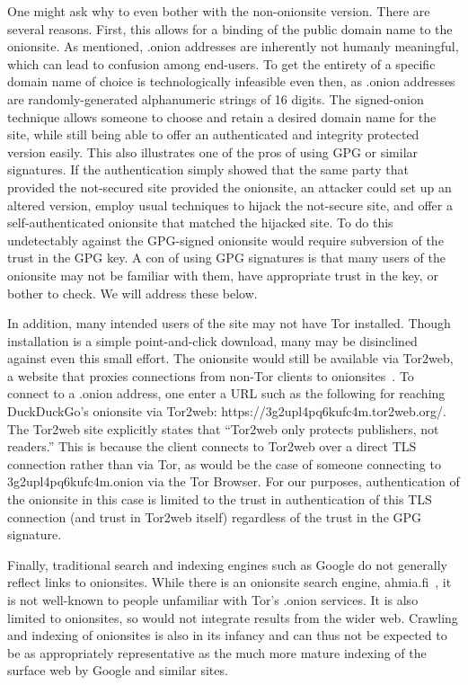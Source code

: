 \documentclass[10pt, conference, compsocconf]{styles/IEEEtran}
\begin{document}
One might ask why to even bother with the non-onionsite version. There
are several reasons. First, this allows for a binding of the public
domain name to the onionsite. As mentioned, .onion addresses are
inherently not humanly meaningful, which can lead to confusion among 
end-users.  To get the entirety of a specific domain name of choice is
technologically infeasible even then, as .onion addresses are
randomly-generated alphanumeric strings of 16 digits. The signed-onion
technique allows someone to choose and retain a desired domain name for the
site, while still being able to offer an authenticated and integrity
protected version easily. This also illustrates one of the pros
of using GPG or similar signatures. If the authentication simply
showed that the same party that provided the not-secured site
provided the onionsite, an attacker could set up an altered version,
employ usual techniques to hijack the not-secure site, and offer
a self-authenticated onionsite that matched the hijacked site.
To do this undetectably against the GPG-signed onionsite would require
subversion of the trust in the GPG key. A con of using GPG signatures
is that many users of the onionsite may not be familiar with them,
have appropriate trust in the key, or bother to check. We will address
these below.

In addition, many intended users of the site may not have Tor installed.
Though installation is a simple point-and-click download, many may be
disinclined against even this small effort. The onionsite would still
be available via Tor2web, a website that proxies connections from
non-Tor clients to onionsites~\cite{tor2web}.  To connect to a .onion
address, one enter a URL such as the following for reaching
DuckDuckGo's onionsite via Tor2web:
https://3g2upl4pq6kufc4m.tor2web.org/. The Tor2web site explicitly
states that ``Tor2web only protects publishers, not readers.'' This is
because the client connects to Tor2web over a direct TLS connection
rather than via Tor, as would be the case of someone connecting to
3g2upl4pq6kufc4m.onion via the Tor Browser.  For our purposes,
authentication of the onionsite in this case is limited to the trust
in authentication of this TLS connection (and trust in Tor2web itself)
regardless of the trust in the GPG signature.

Finally, traditional search and indexing engines such as Google do not
generally reflect links to onionsites. While there is an onionsite
search engine, ahmia.fi~\cite{ahmia}, it is not well-known to people
unfamiliar with Tor's .onion services. It is also limited to
onionsites, so would not integrate results from the wider web.  
Crawling and indexing of onionsites is also in its infancy and can
thus not be expected to be as appropriately representative as the much
more mature indexing of the surface web by Google and similar sites.
\end{document}

